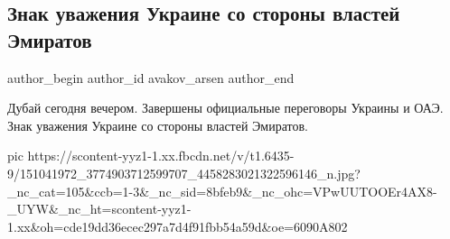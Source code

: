  
 
 
 
 
 
\subsection{Знак уважения Украине со стороны властей Эмиратов}
\label{sec:15_02_2021.fb.avakov_arsen.1.oae_dubaj_znak_uvazhenia}
\ifcmt
 author_begin
   author_id avakov_arsen
 author_end
\fi

Дубай сегодня вечером. Завершены официальные переговоры Украины и ОАЭ.  Знак
уважения Украине со стороны властей Эмиратов.

\ifcmt
  pic https://scontent-yyz1-1.xx.fbcdn.net/v/t1.6435-9/151041972_3774903712599707_4458283021322596146_n.jpg?_nc_cat=105&ccb=1-3&_nc_sid=8bfeb9&_nc_ohc=VPwUUTOOEr4AX8-_UYW&_nc_ht=scontent-yyz1-1.xx&oh=cde19dd36ecec297a7d4f91fbb54a59d&oe=6090A802
\fi


